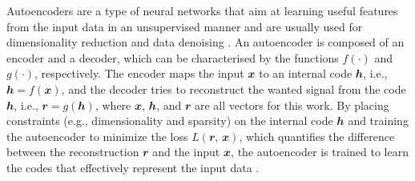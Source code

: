 \documentclass[fleqn,usenatbib]{mnras}
\newcommand{\B}[1]{\mathbfit{#1}}
\newcommand{\editone}[1]{{\leavevmode\color{cyan}#1}}
\begin{document}
\editone{%
Autoencoders are a type of neural networks that aim at learning useful
features from the input data in an unsupervised manner and are usually
used for dimensionality reduction \citep[e.g.,][]{hinton2006,wang2014}
and data denoising \citep[e.g.,][]{xie2012,lu2013,bengio2013}.}  %
An autoencoder is composed of an encoder and a decoder, which can be
characterised by the functions $f(\cdot)$ and $g(\cdot)$, respectively.
The encoder maps the input $\B{x}$ to an internal code $\B{h}$, i.e.,
$\B{h} = f(\B{x})$, and the decoder tries to reconstruct the wanted
signal from the code $\B{h}$, i.e., $\B{r} = g(\B{h})$, where $\B{x}$,
$\B{h}$, and $\B{r}$ are all vectors for this work.
By placing constraints (e.g., dimensionality and sparsity) on the
internal code $\B{h}$ and training the autoencoder to minimize the
loss $L(\B{r}, \,\B{x})$, which quantifies the difference between the
reconstruction $\B{r}$ and the input $\B{x}$, the autoencoder is trained
to learn the codes that effectively represent the input data
\citep[e.g.,][chapter 14]{goodfellow2016}.
\end{document}
